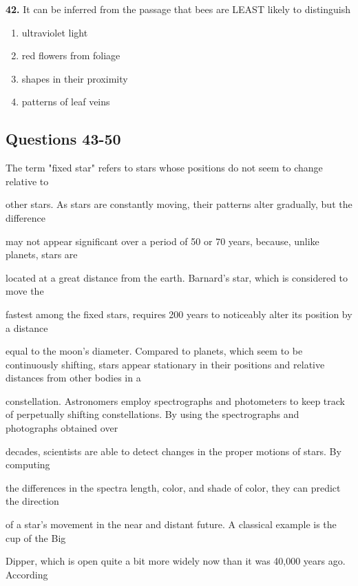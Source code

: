 \documentclass[12pt]{article}
\begin{document}
\par
\vspace{0.25\baselineskip}
\noindent\textbf{42.} It can be inferred from the passage that bees are LEAST likely to distinguish
\begin{enumerate}[label=(\Alph*),leftmargin=*,itemsep=0.2em]
\item ultraviolet light
\item red flowers from foliage
\item shapes in their proximity
\item patterns of leaf veins
\end{enumerate}
\par
\vspace{0.25\baselineskip}
\subsection*{Questions 43-50}
\begingroup
\small
\sloppy
\setlength{\parskip}{0pt}
\setlength{\parindent}{0pt}
The term "fixed star" refers to stars whose positions do not seem to change relative to\par
other stars. As stars are constantly moving, their patterns alter gradually, but the difference\par
may not appear significant over a period of 50 or 70 years, because, unlike planets, stars are\par
located at a great distance from the earth. Barnard's star, which is considered to move the\par
fastest among the fixed stars, requires 200 years to noticeably alter its position by a distance\par
equal to the moon's diameter. Compared to planets, which seem to be continuously shifting, stars appear stationary in their positions and relative distances from other bodies in a\par
constellation. Astronomers employ spectrographs and photometers to keep track of perpetually shifting constellations. By using the spectrographs and photographs obtained over\par
decades, scientists are able to detect changes in the proper motions of stars. By computing\par
the differences in the spectra length, color, and shade of color, they can predict the direction\par
of a star's movement in the near and distant future. A classical example is the cup of the Big\par
Dipper, which is open quite a bit more widely now than it was 40,000 years ago. According\par
\end{document}
